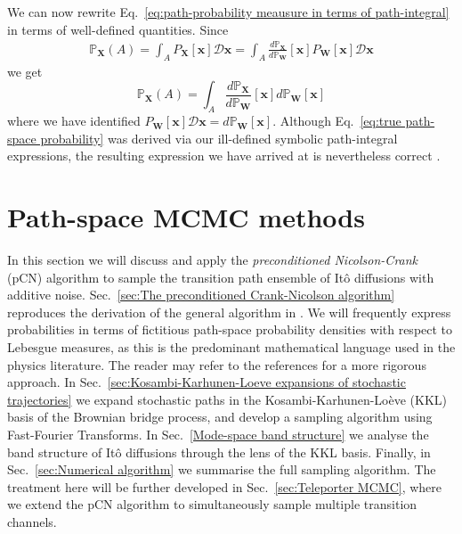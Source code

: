 We can now rewrite Eq.~\ref{eq:path-probability meausure in terms of path-integral} in terms of well-defined quantities. Since
\begin{equation}
\begin{aligned}
\mathbb{P}_\mathbf{X}(A)  =  \int_A P_\mathbf{X}[\mathbf{x}] \mathcal{D} \mathbf{x} 
 = \int_A \frac{d \mathbb{P}_\mathbf{X}}{d \mathbb{P}_\mathbf{W}}[\mathbf{x}] P_\mathbf{W}[\mathbf{x}] \mathcal{D} \mathbf{x} 
\end{aligned}
\end{equation}
we get
\begin{equation} \label{eq:true path-space probability}
\mathbb{P}_\mathbf{X}(A) = \int_A \frac{d \mathbb{P}_\mathbf{X}}{d \mathbb{P}_\mathbf{W}}[\mathbf{x}] d \mathbb{P}_\mathbf{W}[\mathbf{x}]
\end{equation}
where we have identified $P_\mathbf{W}[\mathbf{x}] \mathcal{D} \mathbf{x} = d \mathbb{P}_\mathbf{W}[\mathbf{x}]$. Although Eq.~\ref{eq:true path-space probability} was derived via our ill-defined symbolic path-integral expressions, the resulting expression we have arrived at is nevertheless correct \citep{beskosMCMCMETHODSDIFFUSION2008, hairerAnalysisSPDEsArising2005, hairerAnalysisSPDEsArising2007}.

\section{Path-space MCMC methods} \label{sec:Path-space MCMC}

In this section we will discuss and apply the \textit{preconditioned Nicolson-Crank} (pCN) algorithm to sample the transition path ensemble of It\^{o} diffusions with additive noise. Sec.~\ref{sec:The preconditioned Crank-Nicolson algorithm} reproduces the derivation of the general algorithm in \citep{cotterMCMCMethodsFunctions2013, beskosMCMCMETHODSDIFFUSION2008, hairerAnalysisSPDEsArising2005, hairerAnalysisSPDEsArising2007, hairerSpectralGapsMetropolis2014}. We will frequently express probabilities in terms of fictitious path-space probability densities with respect to Lebesgue measures, as this is the predominant mathematical language used in the physics literature. The reader may refer to the references for a more rigorous approach. In Sec.~\ref{sec:Kosambi-Karhunen-Loeve expansions of stochastic trajectories} we expand stochastic paths in the Kosambi-Karhunen-Lo\`eve (KKL) basis of the Brownian bridge process, and develop a sampling algorithm using Fast-Fourier Transforms. In Sec.~\ref{Mode-space band structure} we analyse the band structure of It\^{o} diffusions through the lens of the KKL basis. Finally, in Sec.~\ref{sec:Numerical algorithm} we summarise the full sampling algorithm. The treatment here will be further developed in Sec.~\ref{sec:Teleporter MCMC}, where we extend the pCN algorithm to simultaneously sample multiple transition channels.

